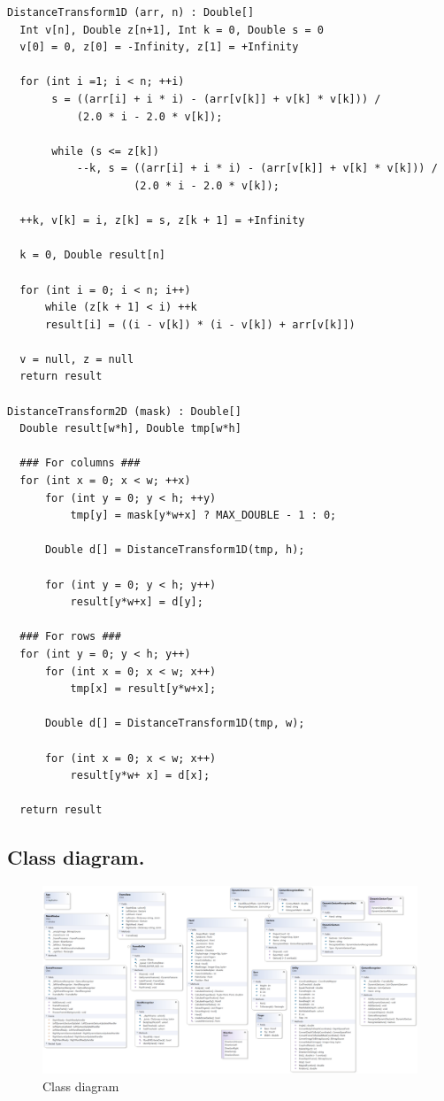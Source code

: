 \documentclass[a4paper,11pt,oneside]{article}
\begin{document}
\begin{verbatim}
DistanceTransform1D (arr, n) : Double[]
  Int v[n], Double z[n+1], Int k = 0, Double s = 0
  v[0] = 0, z[0] = -Infinity, z[1] = +Infinity

  for (int i =1; i < n; ++i)
       s = ((arr[i] + i * i) - (arr[v[k]] + v[k] * v[k])) / 
           (2.0 * i - 2.0 * v[k]);

       while (s <= z[k])
           --k, s = ((arr[i] + i * i) - (arr[v[k]] + v[k] * v[k])) / 
                    (2.0 * i - 2.0 * v[k]);

  ++k, v[k] = i, z[k] = s, z[k + 1] = +Infinity

  k = 0, Double result[n]

  for (int i = 0; i < n; i++)
      while (z[k + 1] < i) ++k
      result[i] = ((i - v[k]) * (i - v[k]) + arr[v[k]])

  v = null, z = null
  return result

DistanceTransform2D (mask) : Double[]
  Double result[w*h], Double tmp[w*h]

  ### For columns ###
  for (int x = 0; x < w; ++x)
      for (int y = 0; y < h; ++y)
          tmp[y] = mask[y*w+x] ? MAX_DOUBLE - 1 : 0;

      Double d[] = DistanceTransform1D(tmp, h);

      for (int y = 0; y < h; y++)
          result[y*w+x] = d[y];

  ### For rows ###
  for (int y = 0; y < h; y++)
      for (int x = 0; x < w; x++)
          tmp[x] = result[y*w+x];

      Double d[] = DistanceTransform1D(tmp, w);

      for (int x = 0; x < w; x++)
          result[y*w+ x] = d[x];

  return result
\end{verbatim}

\newpage
\subsection{Class diagram.}

\begin{figure}[H]
\centering
\includegraphics[scale=0.38]{class-diagram.png}
\caption{Class diagram}
\end{figure}
\end{document}
